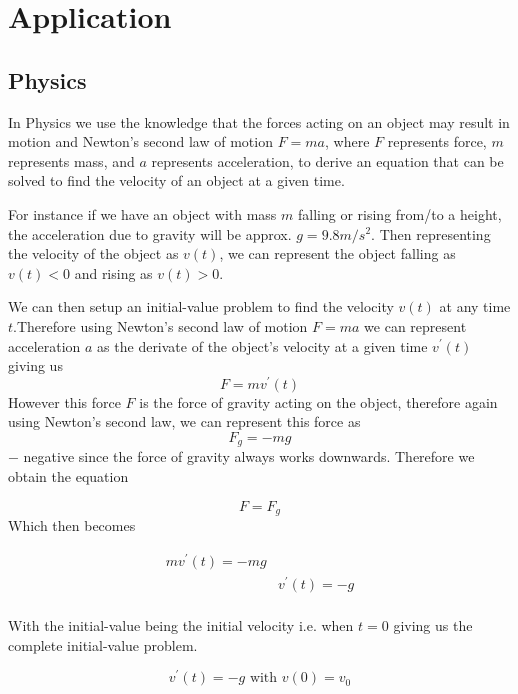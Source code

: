 \documentclass[12pt letter]{report}
\begin{document}
\chapter{Application}

\section{Physics}

In Physics we use the knowledge that the forces acting on an object may result in motion and Newton's second law of
motion $F = ma$, where $F$ represents force, $m$ represents mass, and $a$ represents acceleration, to derive an equation
that can be solved to find the velocity of an object at a given time.

For instance if we have an object with mass $m$ falling or rising from/to a height, the acceleration due to gravity will be approx.
$g= 9.8 m/ s^2$. Then representing the velocity of the object as $v(t)$, we can represent the object falling as $v(t) <
	0$ and rising as $v(t) > 0$.

We can then setup an initial-value problem to find the velocity $v(t)$ at any time $t$.Therefore using Newton's second
law of motion $F = ma$ we can represent acceleration $a$ as the derivate of the object's velocity at a given time
$v^{\prime}(t)$ giving us
\[
	F = mv^{\prime}(t)
\]
However this force $F$ is the force of gravity acting on the object, therefore again using Newton's second law, we can
represent this force as
\[
	F_g = -mg
\]
$-$ negative since the force of gravity always works downwards. Therefore we obtain the equation

\[
	F = F_g
\]
Which then becomes


\begin{align*}
	mv^{\prime}(t) = -mg  \\
	 & v^{\prime}(t) = -g \\
\end{align*}

With the initial-value being the initial velocity i.e. when $t = 0$ giving us the complete initial-value problem.

\[
	v^{\prime}(t) = -g \text{ with } v(0) = v_0
\]


\pagebreak
{}

\end{document}
